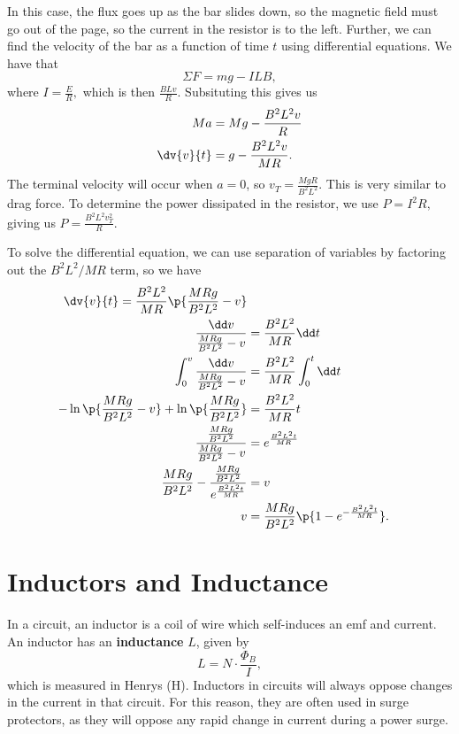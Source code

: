 \documentclass[11pt]{article}
\begin{document}
In this case, the flux goes up as the bar slides down, so the magnetic field must go out of the page, so the current in the resistor is to the left. Further, we can find the velocity of the bar as a function of time $t$ using differential equations. We have that
\[\Sigma F = mg - ILB,\]
where $I = \frac{E}{R},$ which is then $\frac{BLv}{R}$. Subsituting this gives us
\begin{align*}
    Ma &= Mg - \frac{B^2L^2v}{R} \\
    \dv{v}{t} &= g - \frac{B^2L^2v}{MR}.    
\end{align*}
The terminal velocity will occur when $a = 0$, so $v_T = \frac{MgR}{B^2L^2}$. This is very similar to drag force. To determine the power dissipated in the resistor, we use $P = I^2R,$ giving us $P = \frac{B^2L^2v_T^2}{R}$.

To solve the differential equation, we can use separation of variables by factoring out the $B^2L^2/MR$ term, so we have
\begin{align*}
    \dv{v}{t} = \frac{B^2L^2}{MR}\p{\frac{MRg}{B^2L^2} - v} \\
    \frac{\dd v}{\frac{MRg}{B^2L^2} - v} &= \frac{B^2L^2}{MR} \dd t \\
    \int_0^v \frac{\dd v}{\frac{MRg}{B^2L^2} - v} &= \frac{B^2L^2}{MR} \int_0^t \dd t \\
    - \ln\p{\frac{MRg}{B^2L^2} - v} + \ln\p{\frac{MRg}{B^2L^2}} &= \frac{B^2L^2}{MR} t \\
    \frac{\frac{MRg}{B^2L^2}}{\frac{MRg}{B^2L^2}-v} &= e^\frac{B^2L^2t}{MR} \\
    \frac{MRg}{B^2L^2}- \frac{\frac{MRg}{B^2L^2}}{e^\frac{B^2L^2t}{MR}} &= v \\
    v&= \frac{MRg}{B^2L^2}\p{1-e^{-\frac{B^2L^2t}{MR}}}.
\end{align*}

\section{Inductors and Inductance}
In a circuit, an inductor is a coil of wire which self-induces an emf and current. An inductor has an \textbf{inductance} $L$, given by
\begin{equation}
    L = N \cdot \frac{\Phi_B}{I},
\end{equation}
which is measured in Henrys (H). Inductors in circuits will always oppose changes in the current in that circuit. For this reason, they are often used in surge protectors, as they will oppose any rapid change in current during a power surge.
\end{document}
